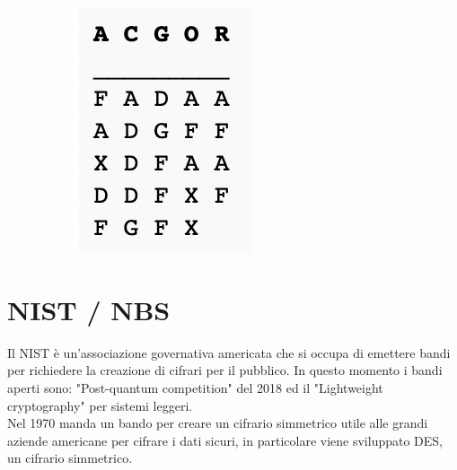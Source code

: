 \documentclass[11pt, oneside]{article}   	%
\begin{document}
\begin{figure}[H]
\begin{subfigure}[h]{0.2\linewidth}
\includegraphics[width=\linewidth]{post}
\end{subfigure}%
\end{figure}
\section*{NIST / NBS}
Il NIST è un'associazione governativa americata che si occupa di emettere bandi per richiedere la creazione di cifrari per il pubblico. In questo momento i bandi aperti sono: "Post-quantum competition" del 2018 ed il "Lightweight cryptography" per sistemi leggeri.\\
Nel 1970 manda un bando per creare un cifrario simmetrico utile alle grandi aziende americane per cifrare i dati sicuri, in particolare viene sviluppato DES, un cifrario simmetrico.
\end{document}

